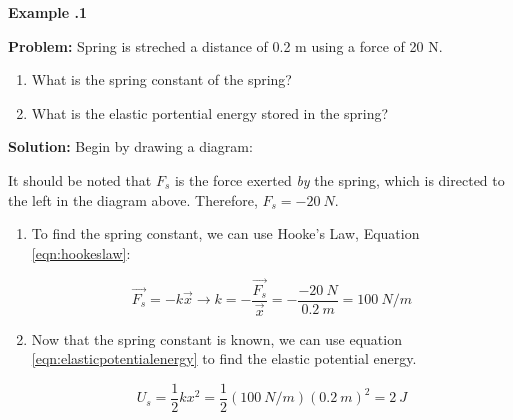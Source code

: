 	\begin{mdframed}[backgroundcolor=blue!10!white]
		\begin{center}
			
			
			\textbf{Example \thesection.1}	
		\end{center}
		
		\textbf{Problem: } Spring is streched a distance of 0.2 m using a force of 20 N.  
		\begin{enumerate}[label=(\alph*)]
			\item What is the spring constant of the spring?
			\item What is the elastic portential energy stored in the spring?
		\end{enumerate}
		\vspace{0.1in}
		
		\textbf{Solution:} 
		Begin by drawing a diagram:
		\vspace{0.1in}
		\begin{center}
			
		
		\end{center}
		
		It should be noted that $F_s$ is the force exerted \textit{by} the spring, which is directed to the left in the diagram above.  Therefore, $F_s = \SI{-20}{N}$.  
\begin{enumerate}[label=(\alph*)]
	\item To find the spring constant, we can use Hooke's Law, Equation \ref{eqn:hookeslaw}:
	
		\begin{equation*}
			\overrightarrow{F_s} = -k\vec{x} \longrightarrow k = - \frac{\overrightarrow{F_s}}{\vec{x}} = -\frac{\SI{-20}{N}}{\SI{0.2}{m}} = \SI{100}{N/m}
		\end{equation*}
	
	\item Now that the spring constant is known, we can use equation \ref{eqn:elasticpotentialenergy} to find the elastic potential energy.  
	
			\begin{equation*}
		U_s = \frac{1}{2}kx^2 = \frac{1}{2}(\SI{100}{N/m})(\SI{0.2}{m})^2 = \SI{2}{J}
	\end{equation*}
\end{enumerate}
		
		
		
		
		
	\end{mdframed}
	
